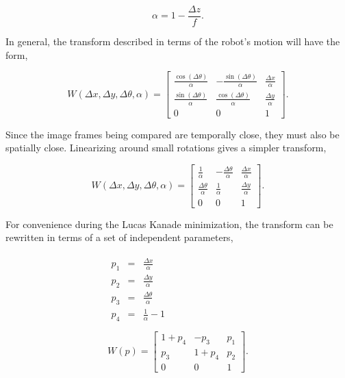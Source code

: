 \documentclass[letterpaper, 10 pt, conference]{ieeeconf}
\newcommand{\comment}[1]{{\color{red}[#1]}}
\begin{document}
\begin{equation} \label{eq:z_motion_conversion}
	\alpha = 1 - \frac{\Delta z}{f}.
\end{equation}

In general, the transform described in terms of the robot's motion will have the form,


\begin{equation*}
W(\Delta x, \Delta y, \Delta \theta, \alpha) = \begin{bmatrix} \frac{\cos(\Delta \theta)}{\alpha} & -\frac{\sin(\Delta \theta)}{\alpha} & \frac{\Delta x}{\alpha} \\ \frac{\sin(\Delta \theta)}{\alpha} & \frac{\cos(\Delta \theta)}{\alpha} & \frac{\Delta y}{\alpha} \\ 0 & 0 & 1 \end{bmatrix}.
\end{equation*}

Since the image frames being compared are temporally close, they must also be spatially close. Linearizing around small rotations gives a simpler transform,

\begin{equation*}
W(\Delta x, \Delta y, \Delta \theta, \alpha) = \begin{bmatrix} \frac{1}{\alpha} & -\frac{\Delta \theta}{\alpha} & \frac{\Delta x}{\alpha} \\ \frac{\Delta \theta}{\alpha} & \frac{1}{\alpha} & \frac{\Delta y}{\alpha} \\ 0 & 0 & 1 \end{bmatrix}.
\end{equation*}

For convenience during the Lucas Kanade minimization, the transform can be rewritten in terms of a set of independent parameters,

\begin{eqnarray}
\begin{split} \label{eq:warp_param_conversion}
p_1 &=& \frac{\Delta x}{\alpha}\\
p_2 &=& \frac{\Delta y}{\alpha}\\
p_3 &=& \frac{\Delta \theta}{\alpha}\\
p_4 &=& \frac{1}{\alpha} - 1\\
\end{split}
\\ \label{eq:param_warp}
W(p) = \begin{bmatrix} 1+p_4 & -p_3 & p_1 \\ p_3 & 1+p_4 & p_2 \\ 0 & 0 & 1 \end{bmatrix}.
\end{eqnarray}
\end{document}
